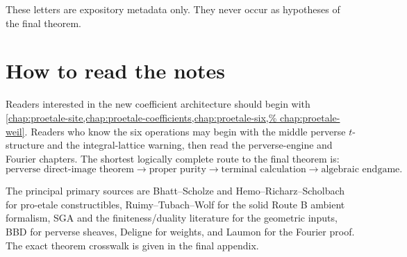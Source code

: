 These letters are expository metadata only.  They never occur as hypotheses
of the final theorem.

\section*{How to read the notes}

Readers interested in the new coefficient architecture should begin with
\cref{chap:proetale-site,chap:proetale-coefficients,chap:proetale-six,%
chap:proetale-weil}.  Readers who know the six operations may begin with the
middle perverse \(t\)-structure and the integral-lattice warning, then read
the perverse-engine and Fourier chapters.  The shortest logically complete
route to the final theorem is:
\[
 \text{perverse direct-image theorem}
 \longrightarrow
 \text{proper purity}
 \longrightarrow
 \text{terminal calculation}
 \longrightarrow
 \text{algebraic endgame}.
\]

The principal primary sources are Bhatt--Scholze and
Hemo--Richarz--Scholbach for pro-etale constructibles,
Ruimy--Tubach--Wolf \cite{RuimyTubachWolfSolid} for the solid Route B
ambient formalism, SGA and the finiteness/duality literature for the
geometric inputs, BBD \cite{BBD} for perverse sheaves,
Deligne \cite{DeligneWeilII} for weights, and Laumon
\cite{LaumonFourier} for the Fourier proof.  The exact theorem crosswalk is
given in the final appendix.
